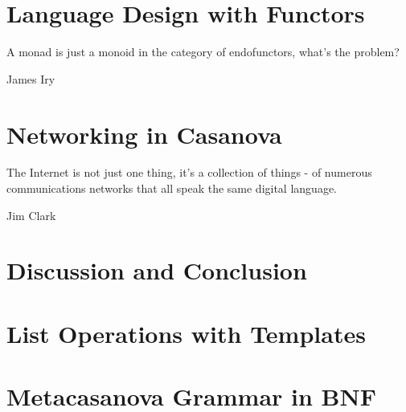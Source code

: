 \documentclass[9pt,a5paper,openright]{extbook}
\theoremstyle{definition}
\begin{document}
\chapter{Language Design with Functors}
\label{ch:functor_languages}
\epigraph{A monad is just a monoid in the category of endofunctors, what's the problem?}{James Iry}


\chapter{Networking in Casanova}
\label{ch:networking}
\epigraph{The Internet is not just one thing, it's a collection of things - of numerous communications networks that all speak the same digital language.}{Jim Clark}


\chapter{Discussion and Conclusion}
\label{ch:discussion}


\appendix
\chapter{List Operations with Templates}
\label{app:template}


\chapter{Metacasanova Grammar in BNF}
\label{app:metacasanova_grammar}


\backmatter



\end{document}
